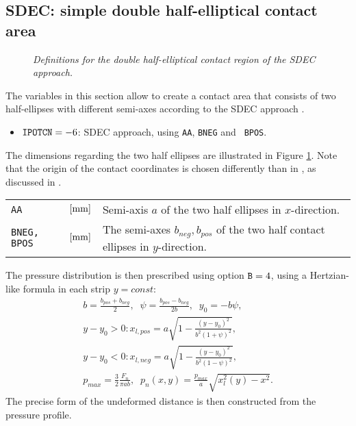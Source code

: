 \documentclass[12pt]{report}
\newenvironment{inputvars}{\vspace{0.4\baselineskip}%

\begin{tabular}{>{\raggedright}p{22mm}p{19mm}p{113mm}}}{
\end{tabular}

}
\newcommand{\inpvar}[3]{{\small\tt #1} & $#2$ & #3 \\[1ex]}
\begin{document}
\subsection{SDEC: simple double half-elliptical contact area}
\label{sec:sdec}

\begin{figure}[bt]
\centering
{}
\caption{\em Definitions for the double half-elliptical contact region of
        the SDEC approach.}
\label{fig:sdec_schema}
\end{figure}

The variables in this section allow to create a contact area that consists
of two half-ellipses with different semi-axes according to the SDEC
approach \cite{Piotrowski2017}. 
\begin{itemize}
\item ${\tt IPOTCN}=-6$: SDEC approach, using {\tt AA}, {\tt BNEG} and {\tt
        BPOS}.
\end{itemize}
The dimensions regarding the two half ellipses are illustrated in Figure
\ref{fig:sdec_schema}. Note that the origin of the contact coordinates is
chosen differently than in \cite{Piotrowski2017}, as discussed in
\cite{Vollebregt2018a-sdec}.
\begin{inputvars}
\inpvar{AA}{\bunit{mm}}{Semi-axis $a$ of the two half ellipses in $x$-direction.}
\inpvar{BNEG, BPOS}{\bunit{mm}}{The semi-axes $b_{neg},b_{pos}$ of the two half
        contact ellipses in $y$-direction.}
\end{inputvars}
The pressure distribution is then prescribed using option ${\tt B}=4$,
using a Hertzian-like formula in each strip $y=const$:
\begin{eqnarray}
   b = \frac{b_{pos}+b_{neg}}{2}, \;\;
   \psi = \frac{b_{pos} - b_{neg}}{2 b}, \;\;
   y_0 = - b \psi,  \\
   y-y_0 > 0: x_{l,pos} = 
                a \sqrt{ 1 - \frac{ (y-y_0)^2 }{ b^2 (1+\psi)^2 } }, \\
   y-y_0 < 0: x_{l,neg} = 
                a \sqrt{ 1 - \frac{ (y-y_0)^2 }{ b^2 (1-\psi)^2 } }, \\
   p_{max} = \frac{3}{2} \frac{F_n}{ \pi ab}, \;\;
   p_n(x,y) = \frac{p_{max}}{a} \sqrt{x^2_l(y) - x^2} .
\end{eqnarray}
The precise form of the undeformed distance is then constructed from the
pressure profile.
\end{document}
